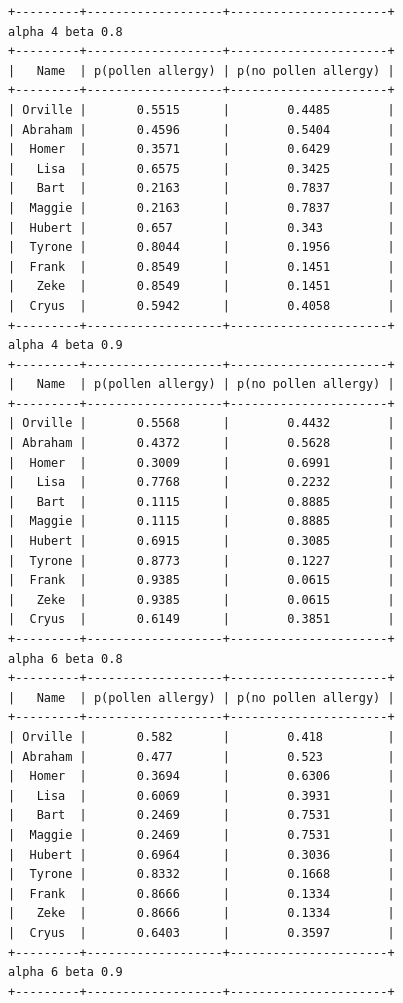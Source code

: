\documentclass{article}
\begin{document}
\begin{lstlisting}
+---------+-------------------+----------------------+
alpha 4 beta 0.8
+---------+-------------------+----------------------+
|   Name  | p(pollen allergy) | p(no pollen allergy) |
+---------+-------------------+----------------------+
| Orville |       0.5515      |        0.4485        |
| Abraham |       0.4596      |        0.5404        |
|  Homer  |       0.3571      |        0.6429        |
|   Lisa  |       0.6575      |        0.3425        |
|   Bart  |       0.2163      |        0.7837        |
|  Maggie |       0.2163      |        0.7837        |
|  Hubert |       0.657       |        0.343         |
|  Tyrone |       0.8044      |        0.1956        |
|  Frank  |       0.8549      |        0.1451        |
|   Zeke  |       0.8549      |        0.1451        |
|  Cryus  |       0.5942      |        0.4058        |
+---------+-------------------+----------------------+
alpha 4 beta 0.9
+---------+-------------------+----------------------+
|   Name  | p(pollen allergy) | p(no pollen allergy) |
+---------+-------------------+----------------------+
| Orville |       0.5568      |        0.4432        |
| Abraham |       0.4372      |        0.5628        |
|  Homer  |       0.3009      |        0.6991        |
|   Lisa  |       0.7768      |        0.2232        |
|   Bart  |       0.1115      |        0.8885        |
|  Maggie |       0.1115      |        0.8885        |
|  Hubert |       0.6915      |        0.3085        |
|  Tyrone |       0.8773      |        0.1227        |
|  Frank  |       0.9385      |        0.0615        |
|   Zeke  |       0.9385      |        0.0615        |
|  Cryus  |       0.6149      |        0.3851        |
+---------+-------------------+----------------------+
alpha 6 beta 0.8
+---------+-------------------+----------------------+
|   Name  | p(pollen allergy) | p(no pollen allergy) |
+---------+-------------------+----------------------+
| Orville |       0.582       |        0.418         |
| Abraham |       0.477       |        0.523         |
|  Homer  |       0.3694      |        0.6306        |
|   Lisa  |       0.6069      |        0.3931        |
|   Bart  |       0.2469      |        0.7531        |
|  Maggie |       0.2469      |        0.7531        |
|  Hubert |       0.6964      |        0.3036        |
|  Tyrone |       0.8332      |        0.1668        |
|  Frank  |       0.8666      |        0.1334        |
|   Zeke  |       0.8666      |        0.1334        |
|  Cryus  |       0.6403      |        0.3597        |
+---------+-------------------+----------------------+
alpha 6 beta 0.9
+---------+-------------------+----------------------+

\end{lstlisting}
\end{document}
